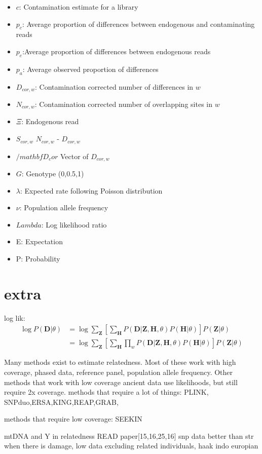 \documentclass[12pt, letterpaper]{article}
\newcommand{\BZ}{\mathbf{Z}}
\newcommand{\BD}{\mathbf{D}}
\newcommand{\BH}{\mathbf{H}}
\begin{document}
\begin{itemize}
\item $c$: Contamination estimate for a library
\item $p_c$: Average proportion of differences between endogenous and contaminating reads
\item $p_e$:Average proportion of differences between endogenous reads
\item $p_a$: Average observed proportion of differences
\item $D_{cor,w}$: Contamination corrected number of differences in $w$
\item $N_{cor,w}$: Contamination corrected number of overlapping sites in $w$
\item $\Xi$: Endogenous read
\item $S_{cor,w}$ $N_{cor,w}$ - $D_{cor,w}$
\item $/mathbf{D_cor}$ Vector of $D_{cor,w}$
\item $G$: Genotype (0,0.5,1)
\item $\lambda$: Expected rate following Poisson distribution
\item $\nu$: Population allele frequency
\item $Lambda$: Log likelihood ratio
\item E: Expectation
\item P: Probability
\end{itemize}



\section{extra}

log lik:
\begin{align}\label{eq:1}
\log P(\BD|\theta) &= \log \sum_{\BZ} [\sum_{\BH} P(\BD|\BZ,\BH, \theta) P(\BH |\theta)] P(\BZ |\theta) \nonumber\\
&= \log \sum_{\BZ} [\sum_{\BH} \prod_w P(\BD|\BZ,\BH, \theta) P(\BH |\theta)] P(\BZ |\theta)
\end{align}


Many methods exist to estimate relatedness. Most of these work with high coverage, phased data, reference panel, population allele frequency. Other methods that work with low coverage ancient data use likelihoods, but still require 2x coverage.
methods that require a lot of things: PLINK, SNPduo,ERSA,KING,REAP,GRAB,

methods that require low coverage: SEEKIN

mtDNA and Y in relatedness READ paper[15,16,25,16]
snp data better than str when there is damage, low data
excluding related individuals, haak indo europian
\end{document}

